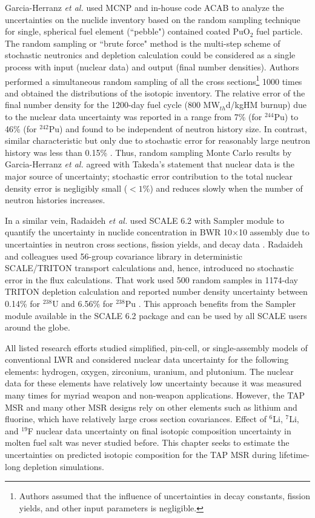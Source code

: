Garcia-Herranz \emph{et al.} used MCNP and in-house code ACAB to analyze the 
uncertainties on the nuclide inventory based on the random sampling technique 
for single, spherical fuel element (``pebble") contained coated PuO$_2$ fuel 
particle. The random sampling or ``brute force" method is the multi-step 
scheme of stochastic neutronics and depletion calculation could be considered 
as a single process with input (nuclear data) and output (final number 
densities). Authors performed a simultaneous random sampling of all the cross 
sections\footnote{Authors assumed that the influence of uncertainties in decay 
constants, fission yields, and other input parameters is negligible.} 1000 
times and obtained the distributions of the isotopic inventory. The relative 
error of the final number density for the 1200-day fuel cycle (800 
MW$_{th}$d/kgHM burnup) due to the nuclear data uncertainty was reported in a 
range from 7\% (for $^{244}$Pu) to 46\% (for $^{242}$Pu) and found to be 
independent of neutron history size. 
In contrast, similar characteristic but only due to stochastic error for 
reasonably large neutron history was less than 0.15\% 
\cite{garcia-herranz_propagation_2008}. Thus, random sampling Monte Carlo 
results by Garcia-Herranz \emph{et al.} agreed with Takeda's statement that 
nuclear data is the major source of uncertainty; stochastic error contribution 
to the total nuclear density error is negligibly small ($<1$\%) and reduces
slowly when the number of neutron histories increases.

In a similar vein, Radaideh \emph{et al.} used SCALE 6.2 with Sampler module
\cite{rearden_scale_2018} to quantify the uncertainty in nuclide concentration 
in \gls{BWR} 10$\times$10 assembly due to uncertainties in neutron cross 
sections, fission yields, and decay data \cite{radaideh_uncertainty_2018}.  
Radaideh and colleagues used 56-group covariance library in deterministic 
SCALE/TRITON transport calculations and, hence, introduced no stochastic error 
in the flux calculations. That work used 500 random samples in 1174-day TRITON 
depletion calculation and reported number density uncertainty between 0.14\% 
for $^{238}$U and 6.56\% for $^{238}$Pu \cite{radaideh_novel_2019-1}. This 
approach benefits from the Sampler module available in the SCALE 6.2 package 
and can be used by all SCALE users around the globe.

All listed research efforts studied simplified, pin-cell, or single-assembly 
models of conventional \gls{LWR} and considered nuclear data uncertainty for 
the following elements: hydrogen, oxygen, zirconium, uranium, and plutonium. 
The nuclear data for these elements have relatively low uncertainty because it 
was measured many times for myriad weapon and non-weapon applications. 
However, the \gls{TAP} \gls{MSR} and many other \gls{MSR} designs rely on 
other elements such as lithium and fluorine, which have relatively large cross 
section covariances. Effect of $^6$Li, $^7$Li, and $^{19}$F nuclear data 
uncertainty 
on final isotopic composition uncertainty in molten fuel salt was never 
studied before. This chapter seeks to estimate the uncertainties on predicted 
isotopic composition for the \gls{TAP} \gls{MSR} during lifetime-long 
depletion simulations.

